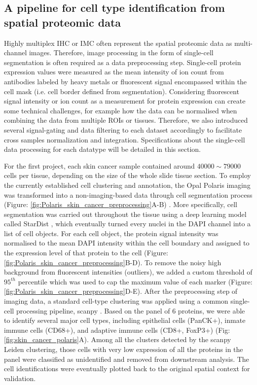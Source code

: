 \subsection{A pipeline for cell type identification from spatial proteomic data}
Highly multiplex IHC  or IMC often represent the spatial proteomic data as multi-channel images. Therefore, image processing in the form of single-cell segmentation is often required as a data preprocessing step. Single-cell protein expression values were measured as the mean intensity of ion count from antibodies labeled by heavy metals or fluorescent signal encompassed within the cell mask (i.e. cell border defined from segmentation). Considering fluorescent signal intensity or ion count as a measurement for protein expression can create some technical challenges, for example how the data can be normalised when combining the data from multiple ROIs or tissues. Therefore, we also introduced several signal-gating and data filtering to each dataset accordingly to facilitate cross samples normalization and integration. Specifications about the single-cell data processing for each datatype will be detailed in this section.  

For the first project, each skin cancer sample contained around $40000\sim 79000$ cells per tissue, depending on the size of the whole slide tissue section. To employ the currently established cell clustering and annotation, the Opal Polaris imaging was transformed into a non-imaging-based data through cell segmentation process (Figure: \ref{fig:Polaris_skin_cancer_preprocessing}A-B) \cite{hickey2021strategies}. More specifically, cell segmentation was carried out throughout the tissue using a deep learning model called StarDist \cite{schmidt2018cell}, which eventually turned every nuclei in the DAPI channel into a list of cell objects. For each cell object, the protein signal intensity was normalised to the mean DAPI intensity within the cell boundary and assigned to the expression level of that protein to the cell (Figure: \ref{fig:Polaris_skin_cancer_preprocessing}B-D). To remove the noisy high background from fluorescent intensities (outliers), we added a custom threshold of $95^{th}$ percentile which was used to cap the maximum value of each marker (Figure: \ref{fig:Polaris_skin_cancer_preprocessing}D-E). After the preprocessing step of imaging data, a standard cell-type clustering was applied using a common single-cell processing pipeline, scanpy \cite{wolf2018scanpy}. Based on the panel of 6 proteins, we were able to identify several major cell types, including epithelial cells (PanCK+), inmate immune cells (CD68+), and adaptive immune cells (CD8+, FoxP3+) (Fig: \ref{fig:skin_cancer_polaris}A). Among all the clusters detected by the scanpy Leiden clustering, those cells with very low expression of all the proteins in the panel were classified as unidentified and removed from downstream analysis. The cell identifications were eventually plotted back to the original spatial context for validation.  


